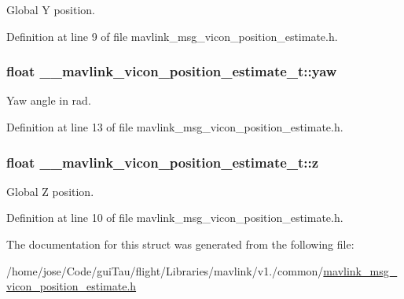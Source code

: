 Global Y position. 



Definition at line 9 of file mavlink\-\_\-msg\-\_\-vicon\-\_\-position\-\_\-estimate.\-h.

\hypertarget{struct____mavlink__vicon__position__estimate__t_a0e0822aace81ee61ff76a034172e4a3c}{
\subsubsection[{yaw}]{\setlength{\rightskip}{0pt plus 5cm}float \-\_\-\-\_\-mavlink\-\_\-vicon\-\_\-position\-\_\-estimate\-\_\-t\-::yaw}}\label{struct____mavlink__vicon__position__estimate__t_a0e0822aace81ee61ff76a034172e4a3c}


Yaw angle in rad. 



Definition at line 13 of file mavlink\-\_\-msg\-\_\-vicon\-\_\-position\-\_\-estimate.\-h.

\hypertarget{struct____mavlink__vicon__position__estimate__t_ae03f3f52e511da08f4df13b95fe8f7a6}{
\subsubsection[{z}]{\setlength{\rightskip}{0pt plus 5cm}float \-\_\-\-\_\-mavlink\-\_\-vicon\-\_\-position\-\_\-estimate\-\_\-t\-::z}}\label{struct____mavlink__vicon__position__estimate__t_ae03f3f52e511da08f4df13b95fe8f7a6}


Global Z position. 



Definition at line 10 of file mavlink\-\_\-msg\-\_\-vicon\-\_\-position\-\_\-estimate.\-h.



The documentation for this struct was generated from the following file\-:\begin{DoxyCompactItemize}
\item 
/home/jose/\-Code/gui\-Tau/flight/\-Libraries/mavlink/v1./common/\hyperlink{mavlink__msg__vicon__position__estimate_8h}{mavlink\-\_\-msg\-\_\-vicon\-\_\-position\-\_\-estimate.\-h}\end{DoxyCompactItemize}
